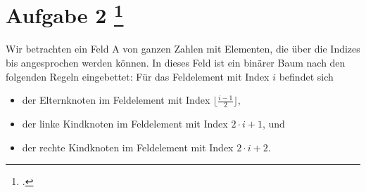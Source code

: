 \documentclass{lehramt-informatik-aufgabe}
\begin{document}

\section{Aufgabe 2
\footcite{examen:66115:2020:09}}

Wir betrachten ein Feld A von ganzen Zahlen mit  Elementen, die über
die Indizes  bis  angesprochen werden können. In dieses Feld
ist ein binärer Baum nach den folgenden Regeln eingebettet: Für das
Feldelement mit Index $i$ befindet sich

\begin{itemize}
\item der Elternknoten im Feldelement mit Index $\lfloor\frac{i-1}{2}\rfloor$,

\item der linke Kindknoten im Feldelement mit Index $2 \cdot i + 1$, und

\item der rechte Kindknoten im Feldelement mit Index $2 \cdot i + 2$.
\end{itemize}
\end{document}
